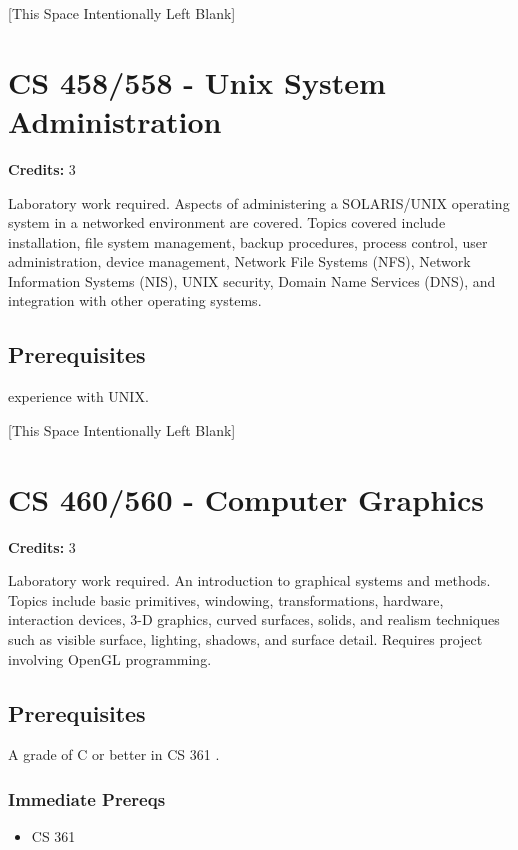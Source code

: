 \documentclass[]{article}
\providecommand{\tightlist}{%
  \setlength{\itemsep}{0pt}\setlength{\parskip}{0pt}}
\newcommand{\pagebreakhere}{
\vspace*{\fill}
\begin{center}
[This Space Intentionally Left Blank]
\end{center}
\vspace*{\fill}
\newpage
}
\begin{document}
\pagebreakhere
\section{CS 458/558 - Unix System
Administration}\label{cs-458558---unix-system-administration}

\textbf{Credits:} 3

Laboratory work required. Aspects of administering a SOLARIS/UNIX
operating system in a networked environment are covered. Topics covered
include installation, file system management, backup procedures, process
control, user administration, device management, Network File Systems
(NFS), Network Information Systems (NIS), UNIX security, Domain Name
Services (DNS), and integration with other operating systems.

\subsection{Prerequisites}\label{prerequisites-37}

experience with UNIX.

\pagebreakhere
\section{CS 460/560 - Computer
Graphics}\label{cs-460560---computer-graphics}

\textbf{Credits:} 3

Laboratory work required. An introduction to graphical systems and
methods. Topics include basic primitives, windowing, transformations,
hardware, interaction devices, 3-D graphics, curved surfaces, solids,
and realism techniques such as visible surface, lighting, shadows, and
surface detail. Requires project involving OpenGL programming.

\subsection{Prerequisites}\label{prerequisites-38}

A grade of C or better in CS 361 .

\subsubsection{Immediate Prereqs}\label{immediate-prereqs-29}

\begin{itemize}
\tightlist
\item
  CS 361
\end{itemize}
\end{document}
